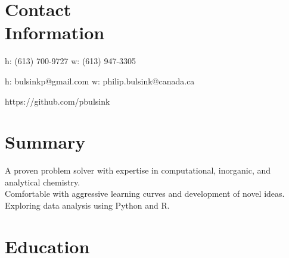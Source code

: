 \documentclass[margin,line]{resume}
\begin{document}
\thispagestyle{plain}
\begin{resume}

    \section{\mysidestyle Contact\\Information}

    h: (613) 700-9727 \hspace{68.5mm} w: (613) 947-3305 \vspace{-4.5mm}
        
    h: bulsinkp@gmail.com \hspace{60mm} w: philip.bulsink@canada.ca
\vspace{-4.5mm}
    
    https://github.com/pbulsink
    \\\vspace{-4.5mm}


    \section{\mysidestyle Summary}

    A proven problem solver with expertise in computational, inorganic, and analytical chemistry.\\ Comfortable with aggressive learning curves and development of novel ideas.\\ Exploring data analysis using Python and R.


    \section{\mysidestyle Education}


\end{resume}
\end{document}
